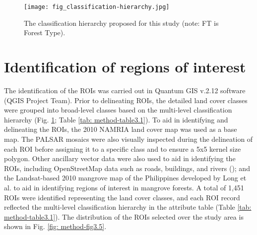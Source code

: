 \begin{figure}
	\centering
	\texttt{[image: fig\_classification-hierarchy.jpg]}
	\caption[The classification hierarchy proposed for this study.]{The classification hierarchy proposed for this study (note: FT is Forest Type).}
	\label{fig: method-fig3.4}
\end{figure}

\section{Identification of regions of interest}
\label{sec: method-roi-identification}

The identification of the ROIs was carried out in Quantum GIS v.2.12 software (QGIS Project Team). Prior to delineating ROIs, the detailed land cover classes were grouped into broad-level classes based on the multi-level classification hierarchy (Fig. \ref{fig: method-fig3.4}; Table \ref{tab: method-table3.1}). To aid in identifying and delineating the ROIs, the 2010 NAMRIA land cover map was used as a base map. The PALSAR mosaics were also visually inspected during the delineation of each ROI before assigning it to a specific class and to ensure a 5x5 kernel size polygon. Other ancillary vector data were also used to aid in identifying the ROIs, including OpenStreetMap data such as roads, buildings, and rivers (\cite{geofabrik_gmbh_philippines_2015}); and the Landsat-based 2010 mangrove map of the Philippines developed by Long et al. \citeyearpar{long_mapping_2013} to aid in identifying regions of interest in mangrove forests. A total of 1,451 ROIs were identified representing the land cover classes, and each ROI record reflected the multi-level classification hierarchy in the attribute table (Table \ref{tab: method-table3.1}). The distribution of the ROIs selected over the study area is shown in Fig. \ref{fig: method-fig3.5}.\\

